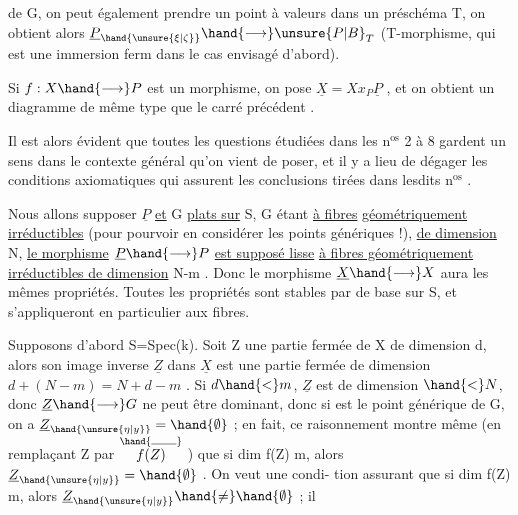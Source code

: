 de G, on peut également prendre un point à valeurs dans un préschéma T,
on obtient alors $\underline{P}_{\hand{\unsure{\xi|\zeta}}} \hand{\longrightarrow} \unsure{P|B}_T$ (T-morphisme, qui est une immersion ferm
dans le cas envisagé d'abord).

Si $f:X \hand{\longrightarrow} P$ est un morphisme, on pose $\underline{X} = Xx_P\underline{P}$ , et on obtient
un diagramme de même type que le carré précédent
.

Il est alors évident que toutes les questions étudiées dans les n$^{\text{os}}$ 2 à 8
gardent un sens dans le contexte général qu'on vient de poser, et il y a
lieu de dégager les conditions axiomatiques qui assurent les conclusions
tirées dans lesdits n$^{\text{os}}$ .

Nous allons supposer $\underline{P}$ \uline{et} G \uline{plats sur} S, G étant \uline{à fibres}
\uline{géométriquement irréductibles} (pour pourvoir en considérer les points
génériques !), \uline{de dimension} N, \uline{le morphisme} $\underline{P} \hand{\longrightarrow} P$ \uline{est supposé lisse}
\uline{à fibres géométriquement irréductibles de dimension} N-m . Donc le
morphisme $\underline{X} \hand{\longrightarrow} X$ aura les mêmes propriétés. Toutes les propriétés
  sont stables par  de base sur S, et s'appliqueront
en particulier aux fibres.

Supposons d'abord S=Spec(k). Soit Z une partie fermée de X de
dimension d, alors son image inverse $\underline{Z}$ dans $\underline{X}$ est une partie fermée de
dimension $d + (N-m) = N + d-m$ . Si $d \hand{<} m$, $\underline{Z}$ est de dimension $\hand{<} N$,
donc $\underline{Z} \hand{\longrightarrow} G$ ne peut être dominant, donc si  est le point générique de
G, on a $\underline{Z}_{\hand{\unsure{\eta|y}}} = \hand{\emptyset}$ ; en fait, ce raisonnement montre même (en remplaçant
Z par $\overset{\hand{\rule{1.8em}{0.35pt}}}{f(Z)}$ ) que si dim f(Z) \hand{$<$} m, alors $\underline{Z}_{\hand{\unsure{\eta|y}}} = \hand{\emptyset}$ . On veut une condi-%
tion  assurant que si dim f(Z) \over{\unsure{$<$}}{$\geq$} m, alors $\underline{Z}_{\hand{\unsure{\eta|y}}} \hand{\neq} \hand{\emptyset}$ ;  il

